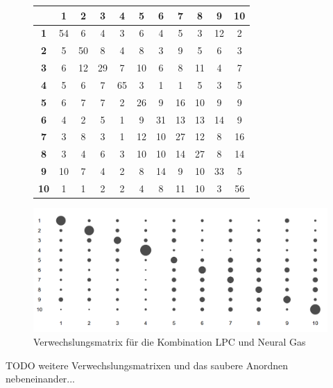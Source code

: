 \begin{figure}[h]
	\label{tbl:lpcNgMatrix}
	\centering
	\hspace*{-15mm}
	\begin{minipage}[t]{0.58\linewidth}
		\begin{tabular}{c|cccccccccc}
			& \textbf{1} & \textbf{2} & \textbf{3} & \textbf{4} & \textbf{5} & \textbf{6} & \textbf{7} & \textbf{8} & \textbf{9} & \textbf{10} \\ \hline
			\textbf{1} & 54 & 6 & 4 & 3 & 6 & 4 & 5 & 3 & 12 & 2 \\
			\textbf{2} & 5 & 50 & 8 & 4 & 8 & 3 & 9 & 5 & 6 & 3 \\
			\textbf{3} & 6 & 12 & 29 & 7 & 10 & 6 & 8 & 11 & 4 & 7 \\
			\textbf{4} & 5 & 6 & 7 & 65 & 3 & 1 & 1 & 5 & 3 & 5 \\
			\textbf{5} & 6 & 7 & 7 & 2 & 26 & 9 & 16 & 10 & 9 & 9 \\
			\textbf{6} & 4 & 2 & 5 & 1 & 9 & 31 & 13 & 13 & 14 & 9 \\
			\textbf{7} & 3 & 8 & 3 & 1 & 12 & 10 & 27 & 12 & 8 & 16 \\
			\textbf{8} & 3 & 4 & 6 & 3 & 10 & 10 & 14 & 27 & 8 & 14 \\
			\textbf{9} & 10 & 7 & 4 & 2 & 8 & 14 & 9 & 10 & 33 & 5 \\
			\textbf{10} & 1 & 1 & 2 & 2 & 4 & 8 & 11 & 10 & 3 & 56 \\
		\end{tabular}
	\end{minipage}
	\begin{minipage}[t]{0.4\linewidth}
		\centering
    	\includegraphics[width=1\linewidth]{images/lpcNgMatrix}
	\end{minipage}
	\caption{Verwechslungsmatrix für die Kombination LPC und Neural Gas}
\end{figure}

TODO weitere Verwechslungsmatrixen und das saubere Anordnen nebeneinander...
		
